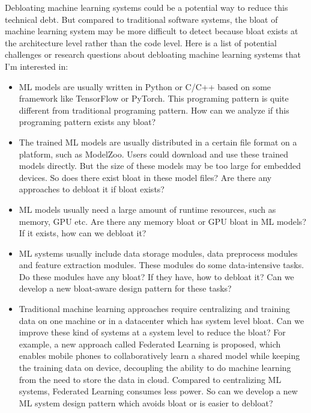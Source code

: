\documentclass[11pt, a4paper]{article}
\begin{document}
Debloating machine learning systems could be a potential way to reduce this technical debt.
But compared to traditional software systems, 
the bloat of machine learning system may be more difficult to detect
because bloat exists at the architecture level rather than the code level.
Here is a list of potential challenges or research questions about debloating machine learning systems that I'm interested in:

\begin{itemize}
    \item ML models are usually written in Python or C/C++ based on some framework like TensorFlow or PyTorch. 
    This programing pattern is quite different from traditional programing pattern. 
    How can we analyze if this programing pattern exists any bloat?
    \item The trained ML models are usually distributed in a certain file format on a platform, such as ModelZoo. Users could download and use these trained models directly. But the size of these models may be too large for embedded devices. So does there exist bloat in these model files? Are there any approaches to debloat it if bloat exists?
    \item ML models usually need a large amount of runtime resources, such as memory, GPU etc. Are there any memory bloat or GPU bloat in ML models? If it exists, how can we debloat it?
    \item ML systems usually include data storage modules, data preprocess modules and feature extraction modules. These modules do some data-intensive tasks. Do these modules have any bloat? If they have, how to debloat it? Can we develop a new bloat-aware design pattern for these tasks?
    \item Traditional machine learning approaches require centralizing and training data on one machine or in a datacenter which has system level bloat. Can we improve these kind of systems at a system level to reduce the bloat? For example, a new approach called Federated Learning is proposed, which enables mobile phones to collaboratively learn a shared model while keeping the training data on device, decoupling the ability to do machine learning from the need to store the data in cloud. Compared to centralizing ML systems, Federated Learning consumes less power. So can we develop a new ML system design pattern which avoids bloat or is easier to debloat?
\end{itemize}
\end{document}
